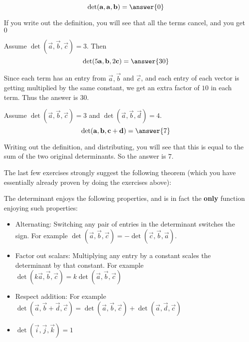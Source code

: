 \documentclass{ximera}
\begin{document}
\begin{question}
  \[
  \det(\vec{a},\vec{a},\vec{b}) = \answer{0}
  \]
  \begin{hint}
    If you write out the definition, you will see that all the terms cancel, and you get $0$
  \end{hint}
\end{question}
	
\begin{question}
  Assume $\det(\vec{a},\vec{b},\vec{c}) = 3$.  Then 
  \[
  \det(5\vec{a},\vec{b},2\vec{c}) = \answer{30}
  \]
  \begin{hint}
    Since each term has an entry from $\vec{a},\vec{b}$ and $\vec{c}$,
    and each entry of each vector is getting multiplied by the same
    constant, we get an extra factor of $10$ in each term.  Thus the
    answer is $30$.
  \end{hint}
\end{question}

\begin{question}
  Assume $\det(\vec{a},\vec{b},\vec{c}) = 3$ and
  $\det(\vec{a},\vec{b},\vec{d}) = 4$.
  \[
  \det(\vec{a},\vec{b},\vec{c}+\vec{d}) = \answer{7}
  \]
  
  \begin{hint}
    Writing out the definition, and distributing, you will see that
    this is equal to the sum of the two original determinants.  So the
    answer is $7$.
  \end{hint}
\end{question}

The last few exercises strongly suggest the following theorem (which you have essentially already proven by doing the exercises above):
	
\begin{theorem}
  The determinant enjoys the following properties, and is in fact the
  \textbf{only} function enjoying such properties:
  
  \begin{itemize}
  \item Alternating: Switching any pair of entries in the determinant
    switches the sign.  For example $\det(\vec{a},\vec{b},\vec{c}) =
    -\det(\vec{c},\vec{b},\vec{a})$.
  \item Factor out scalars: Multiplying any entry by a constant scales
    the determinant by that constant.  For example
    $\det(k\vec{a},\vec{b},\vec{c}) = k\det(\vec{a},\vec{b},\vec{c})$
  \item Respect addition: For example
    $\det(\vec{a},\vec{b}+\vec{d},\vec{c}) =
    \det(\vec{a},\vec{b},\vec{c}) +\det(\vec{a},\vec{d},\vec{c}) $
  \item $\det(\vec{i},\vec{j},\vec{k}) = 1 $
  \end{itemize}
\end{theorem}
\end{document}
